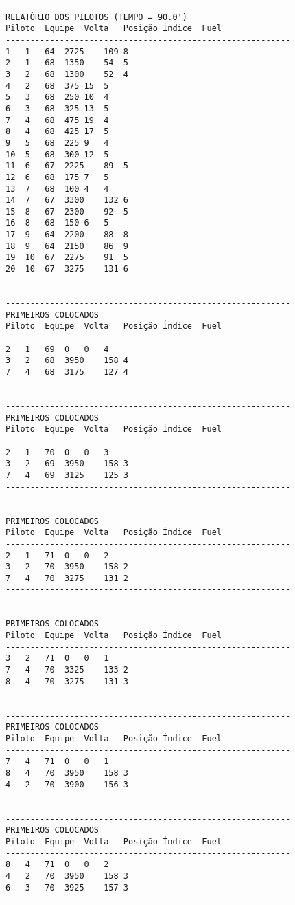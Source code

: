\documentclass[12pt]{article}
\begin{document}
\begin{verbatim}
----------------------------------------------------------
RELATÓRIO DOS PILOTOS (TEMPO = 90.0')
Piloto	Equipe	Volta	Posição	Índice	Fuel
----------------------------------------------------------
1	1	64	2725	109	8
2	1	68	1350	54	5
3	2	68	1300	52	4
4	2	68	375	15	5
5	3	68	250	10	4
6	3	68	325	13	5
7	4	68	475	19	4
8	4	68	425	17	5
9	5	68	225	9	4
10	5	68	300	12	5
11	6	67	2225	89	5
12	6	68	175	7	5
13	7	68	100	4	4
14	7	67	3300	132	6
15	8	67	2300	92	5
16	8	68	150	6	5
17	9	64	2200	88	8
18	9	64	2150	86	9
19	10	67	2275	91	5
20	10	67	3275	131	6
----------------------------------------------------------

----------------------------------------------------------
PRIMEIROS COLOCADOS
Piloto	Equipe	Volta	Posição	Índice	Fuel
----------------------------------------------------------
2	1	69	0	0	4
3	2	68	3950	158	4
7	4	68	3175	127	4
----------------------------------------------------------

----------------------------------------------------------
PRIMEIROS COLOCADOS
Piloto	Equipe	Volta	Posição	Índice	Fuel
----------------------------------------------------------
2	1	70	0	0	3
3	2	69	3950	158	3
7	4	69	3125	125	3
----------------------------------------------------------

----------------------------------------------------------
PRIMEIROS COLOCADOS
Piloto	Equipe	Volta	Posição	Índice	Fuel
----------------------------------------------------------
2	1	71	0	0	2
3	2	70	3950	158	2
7	4	70	3275	131	2
----------------------------------------------------------

----------------------------------------------------------
PRIMEIROS COLOCADOS
Piloto	Equipe	Volta	Posição	Índice	Fuel
----------------------------------------------------------
3	2	71	0	0	1
7	4	70	3325	133	2
8	4	70	3275	131	3
----------------------------------------------------------

----------------------------------------------------------
PRIMEIROS COLOCADOS
Piloto	Equipe	Volta	Posição	Índice	Fuel
----------------------------------------------------------
7	4	71	0	0	1
8	4	70	3950	158	3
4	2	70	3900	156	3
----------------------------------------------------------

----------------------------------------------------------
PRIMEIROS COLOCADOS
Piloto	Equipe	Volta	Posição	Índice	Fuel
----------------------------------------------------------
8	4	71	0	0	2
4	2	70	3950	158	3
6	3	70	3925	157	3
----------------------------------------------------------


\end{verbatim}
\end{document}
